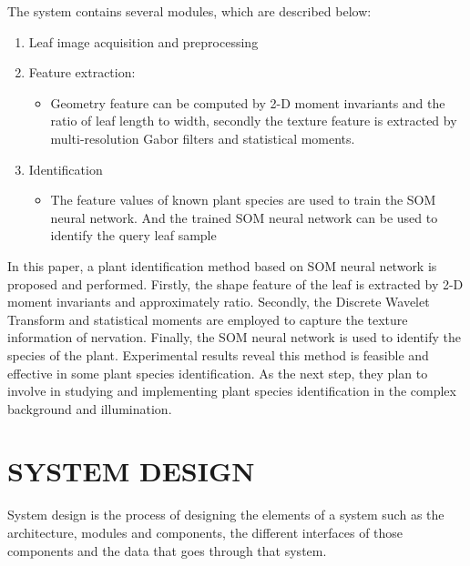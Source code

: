 \noindent The system contains several modules,
which are described below:
\begin{enumerate}
	\item{Leaf image acquisition and preprocessing}
	\item{Feature extraction:}
	\begin{itemize}
		\item{Geometry feature can
		be computed by 2-D moment invariants and the ratio of
		leaf length to width, secondly the texture feature is
		extracted by multi-resolution Gabor filters and statistical
		moments.\\}
	\end{itemize}
	\item{Identification}
	\begin{itemize}
		\item{The feature values of known plant
		species are used to train the SOM neural network. And
		the trained SOM neural network can be used to identify
		the query leaf sample\\}
	\end{itemize}
\end{enumerate}

In this paper, a plant identification method based on
SOM neural network is proposed and performed. Firstly,
the shape feature of the leaf is extracted by 2-D moment
invariants and approximately ratio. Secondly, the Discrete
Wavelet Transform and statistical moments are employed
to capture the texture information of nervation. Finally,
the SOM neural network is used to identify the species of
the plant. Experimental results reveal this method is
feasible and effective in some plant species identification.
As the next step, they plan to involve in studying and implementing plant species
identification in the complex background and
illumination.  


\chapter{SYSTEM DESIGN}

System design is the process of designing the elements of a system such as the architecture, modules and components, the different interfaces of those components and the data that goes through that system.

